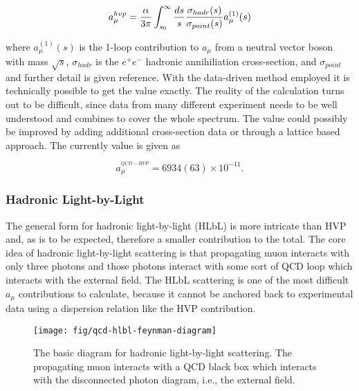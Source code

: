 \begin{equation}
\label{eqn:qcd-hvp-integral}
a_\mu^{hvp} = \frac{\alpha}{3\pi} \int_{s_0}^{\infty} \frac{ds}{s} \\
\frac{\sigma_{hadr}(s)}{\sigma_{point}(s)} a_\mu^{(1)}(s)
\end{equation}

\noindent
where $a_\mu^{(1)}(s)$ is the 1-loop contribution to $a_\mu$ from a neutral vector boson with mass $\sqrt{s}$, $\sigma_{hadr}$ is the $e^+e^-$ hadronic annihiliation cross-section, and $\sigma_{point}$ and further detail is given reference\cite{amm-of-muon}.  With the data-driven method employed it is technically possible to get the value exactly.  The reality of the calculation turns out to be difficult, since data from many different experiment needs to be well understood and combines to cover the whole spectrum.  The value could possibly be improved by adding additional cross-section data or through a lattice based approach.  The currently value is given as

\begin{equation}
\label{eqn:qcd-hvp-total}
a_\mu^{^{QCD-HVP}} = 6934(63) \times 10^{-11}.
\end{equation}

\subsubsection{Hadronic Light-by-Light}

The general form for hadronic light-by-light (HLbL) is more intricate than HVP and, as is to be expected, therefore a smaller contribution to the total.  The core idea of hadronic light-by-light scattering is that propagating muon interacts with only three photons and those photons interact with some sort of QCD loop which interacts with the external field.  The HLbL scattering is one of the most difficult $a_\mu$ contributions to calculate, because it cannot be anchored back to experimental data using a dispersion relation like the HVP contribution\cite{the-muon-g-2}.

\begin{figure}
\label{fig:qcd-hlbl-feynman-diagram}
\centering
\texttt{[image: fig/qcd-hlbl-feynman-diagram]}
\caption{The basic diagram for hadronic light-by-light scattering.  The propagating muon interacts with a QCD black box which interacts with the disconnected photon diagram, i.e., the external field.}
\end{figure}

